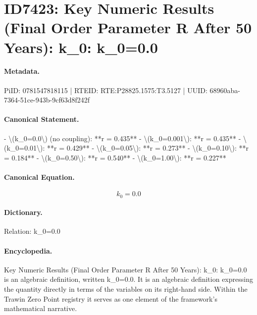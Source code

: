 \section*{ID7423: Key Numeric Results (Final Order Parameter R After 50 Years): k\_0: k\_0=0.0}
\paragraph{Metadata.}
PiID: 0781547818115 | RTEID: RTE:P28825.1575:T3.5127 | UUID: 68960aba-7364-51ce-943b-9cf63d8f242f

\paragraph{Canonical Statement.}
- \textbackslash{}(k\_0=0.0\textbackslash{}) (no coupling): **r = 0.435** - \textbackslash{}(k\_0=0.001\textbackslash{}): **r = 0.435** - \textbackslash{}(k\_0=0.01\textbackslash{}): **r = 0.429** - \textbackslash{}(k\_0=0.05\textbackslash{}): **r = 0.273** - \textbackslash{}(k\_0=0.10\textbackslash{}): **r = 0.184** - \textbackslash{}(k\_0=0.50\textbackslash{}): **r = 0.540** - \textbackslash{}(k\_0=1.00\textbackslash{}): **r = 0.227**

\paragraph{Canonical Equation.}
\[
k_0=0.0
\]

\paragraph{Dictionary.}
Relation: k\_0=0.0

\paragraph{Encyclopedia.}
Key Numeric Results (Final Order Parameter R After 50 Years): k\_0: k\_0=0.0 is an algebraic definition, written k\_0=0.0. It is an algebraic definition expressing the quantity directly in terms of the variables on its right-hand side. Within the Trawin Zero Point registry it serves as one element of the framework's mathematical narrative.
